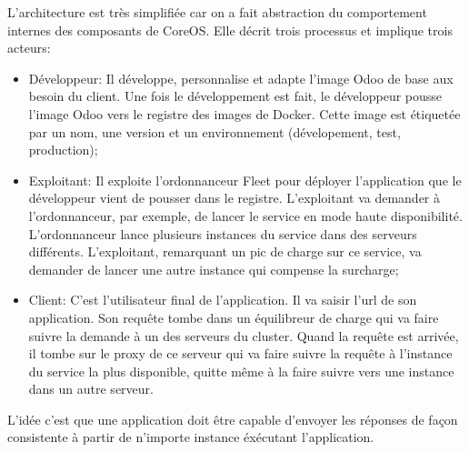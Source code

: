 \begin{onehalfspace}
L'architecture est très simplifiée car on a fait abstraction du comportement internes des composants de CoreOS. Elle décrit trois processus et implique trois acteurs:


\begin{itemize}
 	\item Développeur: Il développe, personnalise et adapte l'image Odoo de base aux besoin du client. Une fois le développement est fait, le développeur pousse l'image Odoo vers le registre des images de Docker. Cette image est étiquetée par un nom, une version et un environnement (dévelopement, test, production);
 	\item Exploitant: Il exploite l'ordonnanceur Fleet pour déployer l'application que le développeur vient de pousser dans le registre. L'exploitant va demander à l'ordonnanceur, par exemple, de lancer le service en mode haute disponibilité. L'ordonnanceur lance plusieurs instances du service dans des serveurs différents. L'exploitant, remarquant un pic de charge sur ce service, va demander de lancer une autre instance qui compense la surcharge;
 	\item Client: C'est l'utilisateur final de l'application. Il va saisir l'\acrshort{url} de son application. Son requête tombe dans un équilibreur de charge qui va faire suivre la demande à un des serveurs du cluster. Quand la requête est arrivée, il tombe sur le proxy de ce serveur qui va faire suivre la requête à l'instance du service la plus disponible, quitte même à la faire suivre vers une instance dans un autre serveur.
 \end{itemize} 


L'idée c'est que une application doit être capable d'envoyer les réponses de façon consistente à partir de n'importe instance éxécutant l'application.


\end{onehalfspace}
